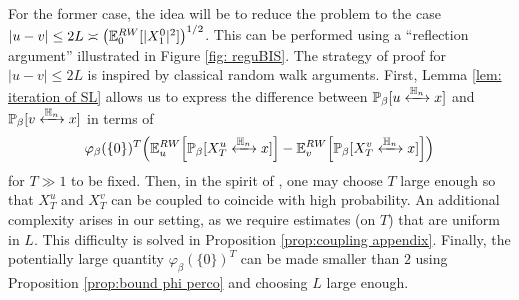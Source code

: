 \documentclass[11pt,a4paper]{article}
\numberwithin{equation}{section}
\theoremstyle{plain}
\theoremstyle{definition}
\newcommand{\connect}{\xleftrightarrow}
\begin{document}
For the former case, the idea will be to reduce the problem to the case $|u-v|\leq 2L \asymp \big(\mathbb E_0^{\rm RW}[|X_1^0|^2]\big)^{1/2}$. This can be performed using a ``reflection argument'' illustrated in Figure \ref{fig: reguBIS}. The strategy of proof for $|u-v|\leq 2L$ is inspired by classical random walk arguments. First, Lemma \ref{lem: iteration of SL} allows us to express the difference between $\mathbb P_\beta[u\connect{\mathbb H_n\:}x]$ and $\mathbb P_\beta[v\connect{\mathbb H_n\:}x]$ in terms of 
\begin{equation} \varphi_\beta(\{0\})^T\Big(\mathbb E^{\rm RW}_{u}\Big[\mathbb P_\beta[X_T^u\connect{\mathbb H_n\:}x]\Big]-\mathbb E^{\rm RW}_{v}\Big[\mathbb P_\beta[X_T^v\connect{\mathbb H_n\:}x]\Big]\Big)
\end{equation}
 for $T\gg 1$ to be fixed. Then, in the spirit of \cite[Lemma~2.4.3]{LawlerLimicRandomWalks2010}, one may choose $T$ large enough so that $X_T^u$ and $X_T^v$ can be coupled to coincide with high probability. An additional complexity arises in our setting, as we require estimates (on $T$) that are uniform in $L$. This difficulty is solved in Proposition \ref{prop:coupling appendix}. Finally, the potentially large quantity $\varphi_\beta(\{0\})^T$ can be made smaller than $2$ using Proposition \ref{prop:bound phi perco} and choosing $L$ large enough. 
 
\end{document}
